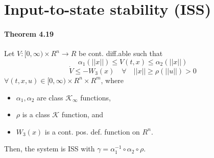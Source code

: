 \section{Input-to-state stability (ISS)}

\paragraph{Theorem 4.19}
Let $V : [0,\infty) \times R^n \rightarrow R$ be cont. diff.able such that
\begin{equation}
	\alpha_1(||x||) \leq V(t,x) \leq \alpha_2(||x||)
\end{equation}
\begin{equation}
	\dot{V} \leq -W_3(x) \quad \forall \quad ||x|| \geq \rho(||u||) > 0
\end{equation}
$\forall (t,x,u) \in [0,\infty) \times R^n \times R^m$, where
\begin{itemize}
	\item $\alpha_1, \alpha_2$ are class $\mathcal{K}_\infty$ functions,
	\item $\rho$ is a class $\mathcal{K}$ function, and
	\item $W_3(x)$ is a cont. pos. def. function on $R^n$.
\end{itemize}
Then, the system is ISS with $\gamma=\alpha_1^{-1} \circ \alpha_2 \circ \rho$.